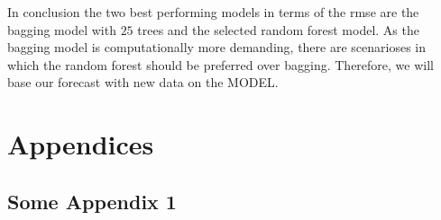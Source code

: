 \documentclass[11pt,]{article}
\begin{document}
In conclusion the two best performing models in terms of the \ac{rmse}
are the bagging model with \(25\) trees and the selected random forest
model. As the bagging model is computationally more demanding, there are
scenarioses in which the random forest should be preferred over bagging.
Therefore, we will base our forecast with new data on the MODEL.
\pagebreak

\printbibliography[title = References]
\cleardoublepage

\begin{refsection}
\nocite{R-base}
\nocite{R-broom}
\nocite{R-dplyr}
\nocite{R-ggplot2}
\nocite{R-haven}
\nocite{R-lmtest}
\nocite{R-PerformanceAnalytics}
\nocite{R-rstudioapi}
\nocite{R-sandwich}
\nocite{R-stargazer}
\nocite{R-svMisc}
\nocite{R-tidyr}
\nocite{R-xts}
\nocite{R-Studio}
\printbibliography[title = Software-References]
\end{refsection}

\cleardoublepage
\appendix
\setcounter{table}{0}
\renewcommand{\thetable}{A\arabic{table}}

\hypertarget{appendices}{%
\section{Appendices}\label{appendices}}

\hypertarget{some-appendix-1}{%
\subsection{Some Appendix 1}\label{some-appendix-1}}

\end{document}
